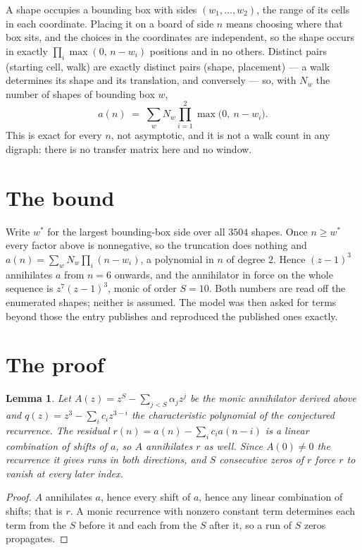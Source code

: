 \documentclass[11pt,a4paper]{article}
\theoremstyle{plain}
\newtheorem{lemma}[theorem]{Lemma}
\theoremstyle{definition}
\begin{document}
A shape occupies a bounding box with sides $(w_1,\dots,w_{2})$, the range of its cells in each
coordinate. Placing it on a board of side $n$ means choosing where that box sits, and the
choices in the coordinates are independent, so the shape occurs in exactly
$\prod_{i}\max(0,\,n-w_i)$ positions and in no others. Distinct pairs (starting cell,
walk) are exactly distinct pairs (shape, placement) --- a walk determines its shape and its
translation, and conversely --- so, with $N_w$ the number of shapes of bounding box $w$,
\[
a(n)\;=\;\sum_{w} N_w \prod_{i=1}^{2}\max\bigl(0,\ n-w_i\bigr).
\]
This is exact for every $n$, not asymptotic, and it is not a walk count in any digraph: there is
no transfer matrix here and no window.

\section{The bound}

Write $w^\ast$ for the largest bounding-box side over all $3504$ shapes. Once $n\ge w^\ast$
every factor above is nonnegative, so the truncation does nothing and
$a(n)=\sum_w N_w\prod_i(n-w_i)$, a polynomial in $n$ of degree $2$. Hence $(z-1)^{3}$
annihilates $a$ from $n=6$ onwards, and the annihilator in force on the whole sequence is
$z^{7}(z-1)^{3}$, monic of order $S=10$. Both numbers are read off the enumerated
shapes; neither is assumed. The model was then asked for terms beyond those the entry publishes
and reproduced the published ones exactly.

\section{The proof}

\begin{lemma}\label{lem:crit}
Let $A(z)=z^S-\sum_{j<S}\alpha_jz^{j}$ be the monic annihilator derived above and
$q(z)=z^{3}-\sum_ic_iz^{3-i}$ the characteristic polynomial of the conjectured
recurrence. The residual $r(n)=a(n)-\sum_ic_ia(n-i)$ is a linear combination of shifts of $a$,
so $A$ annihilates $r$ as well. Since $A(0)\ne0$ the recurrence it gives runs in both
directions, and $S$ consecutive zeros of $r$ force $r$ to vanish at every later index.
\end{lemma}

\begin{proof}
$A$ annihilates $a$, hence every shift of $a$, hence any linear combination of shifts; that is
$r$. A monic recurrence with nonzero constant term determines each term from the $S$ before it
and each from the $S$ after it, so a run of $S$ zeros propagates.
\end{proof}
\end{document}
